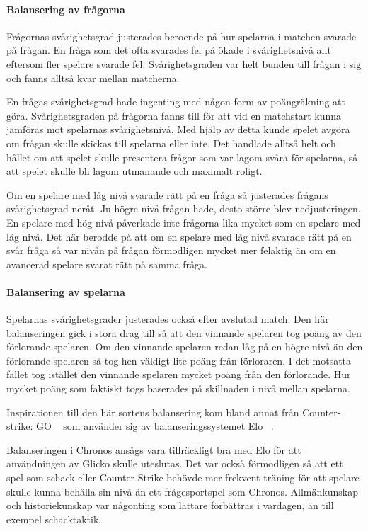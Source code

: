 \documentclass[a4paper, 11pt]{article}
\begin{document}
\paragraph{Balansering av frågorna}

Frågornas svårighetsgrad justerades beroende på hur spelarna i matchen svarade på frågan. En fråga som det ofta svarades fel på ökade i svårighetsnivå allt eftersom fler spelare svarade fel. Svårighetsgraden var helt bunden till frågan i sig och fanns alltså kvar mellan matcherna.

En frågas svårighetsgrad hade ingenting med någon form av poängräkning att göra. Svårighetsgraden på frågorna fanns till för att vid en matchstart kunna jämföras mot spelarnas svårighetsnivå. Med hjälp av detta kunde spelet avgöra om frågan skulle skickas till spelarna eller inte. Det handlade alltså helt och hållet om att spelet skulle presentera frågor som var lagom svåra för spelarna, så att spelet skulle bli lagom utmanande och maximalt roligt.

Om en spelare med låg nivå svarade rätt på en fråga så justerades frågans svårighetsgrad neråt. Ju högre nivå frågan hade, desto större blev nedjusteringen. En spelare med hög nivå påverkade inte frågorna lika mycket som en spelare med låg nivå. Det här berodde på att om en spelare med låg nivå svarade rätt på en svår fråga så var nivån på frågan förmodligen mycket mer felaktig än om en avancerad spelare svarat rätt på samma fråga. 

\paragraph{Balansering av spelarna}

Spelarnas svårighetsgrader justerades också efter avslutad match. Den här balanseringen gick i stora drag till så att den vinnande spelaren tog poäng av den förlorande spelaren. Om den vinnande spelaren redan låg på en högre nivå än den förlorande spelaren så tog hen väldigt lite poäng från förloraren. I det motsatta fallet tog istället den vinnande spelaren mycket poäng från den förlorande. Hur mycket poäng som faktiskt togs baserades på skillnaden i nivå mellan spelarna. 

Inspirationen till den här sortens balansering kom bland annat från Counter-strike: GO ~\cite{cs} som använder sig av balanseringssystemet Elo ~\cite{elo}. 

Balanseringen i Chronos ansågs vara tillräckligt bra med Elo för att användningen av Glicko skulle uteslutas. Det var också förmodligen så att ett spel som schack eller Counter Strike behövde mer frekvent träning för att spelare skulle kunna behålla sin nivå än ett frågesportspel som Chronos. Allmänkunskap och historiekunskap var någonting som lättare förbättras i vardagen, än till exempel schacktaktik. 
\end{document}
